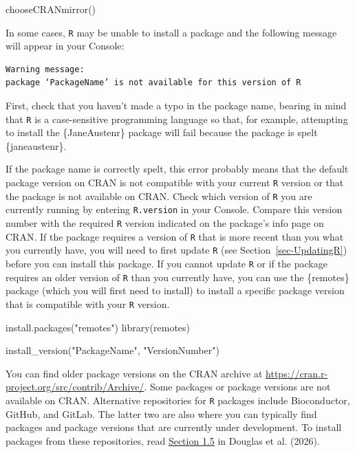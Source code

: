 \documentclass[
  letterpaper,
  DIV=11,
  numbers=noendperiod]{scrreprt}
\newenvironment{Shaded}{\begin{snugshade}}{\end{snugshade}}
\newcommand{\FunctionTok}[1]{\textcolor[rgb]{0.28,0.35,0.67}{#1}}
\newcommand{\NormalTok}[1]{\textcolor[rgb]{0.00,0.23,0.31}{#1}}
\newcommand{\StringTok}[1]{\textcolor[rgb]{0.13,0.47,0.30}{#1}}
\begin{document}
\begin{tcolorbox}
\begin{Shaded}
\begin{Highlighting}[]
\FunctionTok{chooseCRANmirror}\NormalTok{()}
\end{Highlighting}
\end{Shaded}

In some cases, \texttt{R} may be unable to install a package and the
following message will appear in your Console:

\begin{verbatim}
Warning message:
package ‘PackageName’ is not available for this version of R
\end{verbatim}

First, check that you haven't made a typo in the package name, bearing
in mind that \texttt{R} is a case-sensitive programming language so
that, for example, attempting to install the \{JaneAustenr\} package
will fail because the package is spelt \{janeaustenr\}.

If the package name is correctly spelt, this error probably means that
the default package version on CRAN is not compatible with your current
\texttt{R} version or that the package is not available on CRAN. Check
which version of \texttt{R} you are currently running by entering
\texttt{R.version} in your Console. Compare this version number with the
required \texttt{R} version indicated on the package's info page on
CRAN. If the package requires a version of \texttt{R} that is more
recent than you what you currently have, you will need to first update
\texttt{R} (see Section~\ref{sec-UpdatingR}) before you can install this
package. If you cannot update \texttt{R} or if the package requires an
older version of \texttt{R} than you currently have, you can use the
\{remotes\} package (which you will first need to install) to install a
specific package version that is compatible with your \texttt{R}
version.

\begin{Shaded}
\begin{Highlighting}[]
\FunctionTok{install.packages}\NormalTok{(}\StringTok{"remotes"}\NormalTok{)}
\FunctionTok{library}\NormalTok{(remotes)}

\FunctionTok{install\_version}\NormalTok{(}\StringTok{"PackageName"}\NormalTok{, }\StringTok{"VersionNumber"}\NormalTok{) }
\end{Highlighting}
\end{Shaded}

You can find older package versions on the CRAN archive at
\url{https://cran.r-project.org/src/contrib/Archive/}. Some packages or
package versions are not available on CRAN. Alternative repositories for
\texttt{R} packages include Bioconductor, GitHub, and GitLab. The latter
two are also where you can typically find packages and package versions
that are currently under development. To install packages from these
repositories, read \href{https://intro2r.com/packages.html}{Section 1.5}
in Douglas et al. (2026).

\end{tcolorbox}
\end{document}
